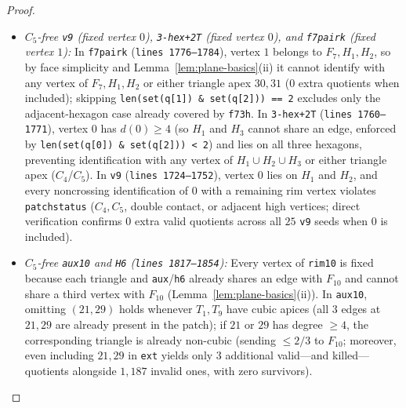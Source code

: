 \documentclass[11pt,reqno]{amsart}
\theoremstyle{plain}
\theoremstyle{definition}
\theoremstyle{remark}
\DeclareRobustCommand{\_}{\ifmmode\text{\textunderscore}\else\textunderscore\allowbreak\fi}
\begin{document}
\begin{proof}
\begin{itemize}[leftmargin=1.5em]
  \item \emph{$C_5$-free \texttt{v9} (fixed vertex $0$), \texttt{3-hex+2T} (fixed vertex $0$), and \texttt{f7\_pair\_k} (fixed vertex $1$):} In \texttt{f7\_pair\_k} (\texttt{lines 1776--1784}), vertex $1$ belongs to $F_7, H_1, H_2$, so by face simplicity and Lemma~\ref{lem:plane-basics}(ii) it cannot identify with any vertex of $F_7, H_1, H_2$ or either triangle apex $30, 31$ ($0$ extra quotients when included); skipping \texttt{len(set(q[1]) \& set(q[2])) == 2} excludes only the adjacent-hexagon case already covered by \texttt{f7\_3h}. In \texttt{3-hex+2T} (\texttt{lines 1760--1771}), vertex $0$ has $d(0) \ge 4$ (so $H_1$ and $H_3$ cannot share an edge, enforced by \texttt{len(set(q[0]) \& set(q[2])) < 2}) and lies on all three hexagons, preventing identification with any vertex of $H_1 \cup H_2 \cup H_3$ or either triangle apex ($C_4$/$C_5$). In \texttt{v9} (\texttt{lines 1724--1752}), vertex $0$ lies on $H_1$ and $H_2$, and every noncrossing identification of $0$ with a remaining rim vertex violates \texttt{patch\_status} ($C_4, C_5$, double contact, or adjacent high vertices; direct verification confirms $0$ extra valid quotients across all $25$ \texttt{v9} seeds when $0$ is included).
  \item \emph{$C_5$-free \texttt{aux10} and \texttt{H6} (\texttt{lines 1817--1854}):} Every vertex of \texttt{rim10} is fixed because each triangle and \texttt{aux}/\texttt{h6} already shares an edge with $F_{10}$ and cannot share a third vertex with $F_{10}$ (Lemma~\ref{lem:plane-basics}(ii)). In \texttt{aux10}, omitting $(21, 29)$ holds whenever $T_1, T_9$ have cubic apices (all $3$ edges at $21, 29$ are already present in the patch); if $21$ or $29$ has degree $\ge 4$, the corresponding triangle is already non-cubic (sending $\le 2/3$ to $F_{10}$; moreover, even including $21, 29$ in \texttt{ext} yields only $3$ additional valid---and killed---quotients alongside $1{,}187$ invalid ones, with zero survivors).

\end{itemize}
\end{proof}
\end{document}
